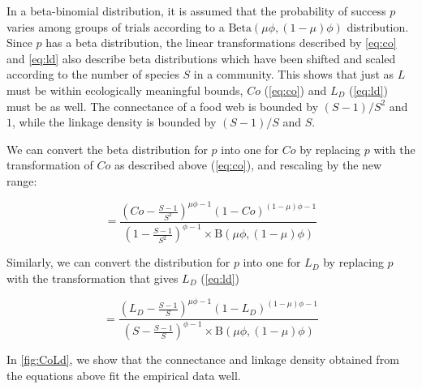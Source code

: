 \documentclass[12pt]{article}
\begin{document}
In a beta-binomial distribution, it is assumed that the probability of
success \(p\) varies among groups of trials according to a
\(\text{Beta}(\mu\phi, (1-\mu)\phi)\) distribution. Since \(p\) has a
beta distribution, the linear transformations described by \cref{eq:co}
and \cref{eq:ld} also describe beta distributions which have been
shifted and scaled according to the number of species \(S\) in a
community. This shows that just as \(L\) must be within ecologically
meaningful bounds, \(Co\) (\cref{eq:co}) and \(L_D\) (\cref{eq:ld}) must
be as well. The connectance of a food web is bounded by \((S-1)/S^2\)
and \(1\), while the linkage density is bounded by \((S-1)/S\) and
\(S\).

We can convert the beta distribution for \(p\) into one for \(Co\) by
replacing \(p\) with the transformation of \(Co\) as described above
(\cref{eq:co}), and rescaling by the new range:

\begin{equation}
[Co | S, \mu, \phi] = \frac{\left(Co - \frac{S-1}{S^2}\right)^{\mu \phi - 1}\left(1 - Co\right)^{(1 - \mu)\phi - 1} }{\left(1 - \frac{S-1}{S^2}\right)^{\phi - 1} \times \mathrm{B}(\mu \phi, (1 - \mu)\phi)}
\label{eq:shiftBetaCo}\end{equation}

Similarly, we can convert the distribution for \(p\) into one for
\(L_D\) by replacing \(p\) with the transformation that gives \(L_D\)
(\cref{eq:ld})

\begin{equation}
[L_{D} | S, \mu, \phi] = \frac{\left(L_D - \frac{S-1} {S}\right)^{\mu \phi - 1}\left(1 - L_D\right)^{(1 - \mu)\phi - 1} }{\left(S - \frac{S-1}{S}\right)^{\phi - 1} \times \mathrm{B}(\mu \phi, (1 - \mu)\phi)}
\label{eq:shiftBetaLD}\end{equation}

In \cref{fig:CoLd}, we show that the connectance and linkage density
obtained from the equations above fit the empirical data well.
\end{document}

